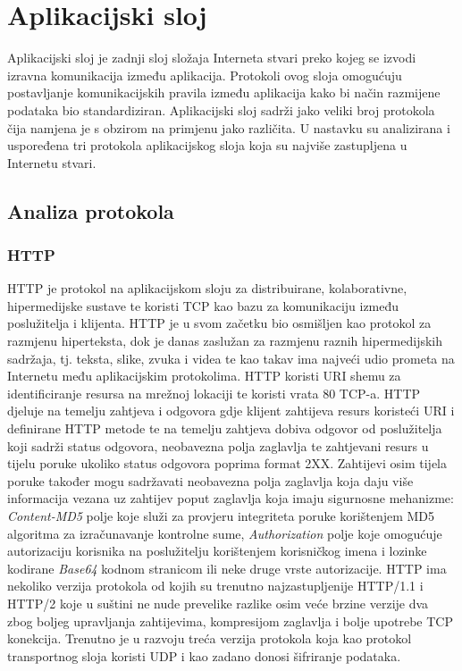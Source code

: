 \documentclass[times, utf8, diplomski]{fer}
\begin{document}
\section{Aplikacijski sloj}
Aplikacijski sloj je zadnji sloj složaja Interneta stvari preko kojeg se izvodi izravna komunikacija između aplikacija. Protokoli ovog sloja omogućuju postavljanje komunikacijskih pravila između aplikacija kako bi način razmijene podataka bio standardiziran. Aplikacijski sloj sadrži jako veliki broj protokola čija namjena je s obzirom na primjenu jako različita. U nastavku su analizirana i uspoređena tri protokola aplikacijskog sloja koja su najviše zastupljena u Internetu stvari.

\subsection{Analiza protokola}
\subsubsection{HTTP}
HTTP  je protokol na aplikacijskom sloju za distribuirane, kolaborativne, hipermedijske sustave te koristi TCP kao bazu za komunikaciju između poslužitelja i klijenta. HTTP je u svom začetku bio osmišljen kao protokol za razmjenu hiperteksta, dok je danas zaslužan za razmjenu raznih hipermedijskih sadržaja, tj. teksta, slike, zvuka i videa te kao takav ima najveći udio prometa na Internetu među aplikacijskim protokolima. HTTP koristi URI  shemu za identificiranje resursa na mrežnoj lokaciji te koristi vrata 80 TCP-a. HTTP djeluje na temelju zahtjeva i odgovora gdje klijent zahtijeva resurs koristeći URI i definirane HTTP metode te na temelju zahtjeva dobiva odgovor od poslužitelja koji sadrži status odgovora, neobavezna polja zaglavlja te zahtjevani resurs u tijelu poruke ukoliko status odgovora poprima format 2XX. Zahtijevi osim tijela poruke također mogu sadržavati neobavezna polja zaglavlja koja daju više informacija vezana uz zahtijev poput zaglavlja koja imaju sigurnosne mehanizme: \emph{Content-MD5} polje koje služi za provjeru integriteta poruke korištenjem MD5 algoritma za izračunavanje kontrolne sume, \emph{Authorization} polje koje omogućuje autorizaciju korisnika na poslužitelju korištenjem korisničkog imena i lozinke kodirane \emph{Base64} kodnom stranicom ili neke druge vrste autorizacije. HTTP ima nekoliko verzija protokola od kojih su trenutno najzastupljenije HTTP/1.1 i HTTP/2 koje u suštini ne nude prevelike razlike osim veće brzine verzije dva zbog boljeg upravljanja zahtijevima, kompresijom zaglavlja i bolje upotrebe TCP konekcija. Trenutno je u razvoju treća verzija protokola koja kao protokol transportnog sloja koristi UDP i kao zadano donosi šifriranje podataka.
\end{document}
